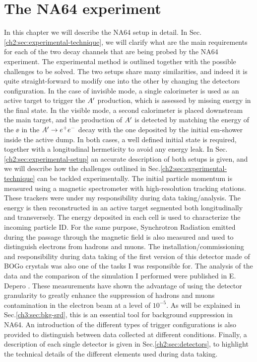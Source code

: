 
\newcommand{\pdirtwo}{chapters/plots/chapter2}

\chapter{The NA64 experiment} %

\label{chapter2} %


In this chapter we will describe the NA64 setup in detail. In Sec.\ref{ch2:sec:experimental-technique}, we will clarify what are the main requirements for each of the two decay channels that are being probed by the NA64 experiment. The experimental method is outlined together with the possible challenges to be solved. The two setups share many similarities, and indeed it is quite straight-forward to modify one into the other by changing the detectors configuration. In the case of invisible mode, a single calorimeter is used as an active target to trigger the $A'$ production, which is assessed by missing energy in the final state. In the visible mode, a second calorimeter is placed downstream the main target, and the production of $A'$ is detected by matching the energy of the $\ee$ in the $A' \to e^+e^-$ decay with the one deposited by the initial em-shower inside the active dump. In both cases, a well defined initial state is required, together with a longitudinal hermeticity to avoid any energy leak. In Sec.\ref{ch2:sec:experimental-setup} an accurate description of both setups is given, and we will describe how the challenges outlined in Sec.\ref{ch2:sec:experimental-technique} can be tackled experimentally. The initial particle momentum is measured using a magnetic spectrometer with high-resolution tracking stations. These trackers were under my responsibility during data taking/analysis. The energy is then reconstructed in an active target segmented both longitudinally and transversely. The energy deposited in each cell is used to characterize the incoming particle ID. For the same purpose, Synchrotron Radiation emitted during the passage through the magnetic field is also measured and used to distinguish electrons from hadrons and muons. The installation/commissioning and responsibility during data taking of the first version of this detector made of BOGo crystals was also one of the tasks I was responsible for. The analysis of the data and the comparison of the simulation I performed were published in E. Depero \cite{Depero:2017mrr}. These measurements have shown the advantage of using the detector granularity to greatly enhance the suppression of hadrons and muons contamination in the electron beam at a level of $10^{-5}$. As will be explained in Sec.\ref{ch3:sec:bkg-srd}, this is an essential tool for background suppression in NA64. An introduction of the different types of trigger configurations is also provided to distinguish between data collected at different conditions.
Finally, a description of each single detector is given in Sec.\ref{ch2:sec:detectors}, to highlight  the technical details of the different elements used during data taking. 

